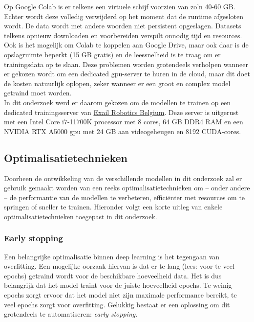 Op Google Colab is er telkens een virtuele schijf voorzien van zo'n 40-60 GB. Echter wordt deze volledig verwijderd op het moment dat de runtime afgesloten wordt. De data wordt met andere woorden niet persistent opgeslagen. Datasets telkens opnieuw downloaden en voorbereiden verspilt onnodig tijd en resources. Ook is het mogelijk om Colab te koppelen aan Google Drive, maar ook daar is de opslagruimte beperkt (15 GB gratis) en de leessnelheid is te traag om er trainingsdata op te slaan. Deze problemen worden grotendeels verholpen wanneer er gekozen wordt om een dedicated \gls{gpu}-server te huren in de cloud, maar dit doet de kosten natuurlijk oplopen, zeker wanneer er een groot en complex model getraind moet worden. \\

In dit onderzoek werd er daarom gekozen om de modellen te trainen op een dedicated trainingsserver van \href{https://www.exail.com/}{Exail Robotics Belgium}. Deze server is uitgerust met een Intel Core i7-11700K processor met 8 cores, 64 GB DDR4 RAM en een NVIDIA RTX A5000 \gls{gpu} met 24 GB aan videogeheugen en 8192 CUDA-cores. \autocite{TechPowerUp_RTX-A5000}

\subsection{Optimalisatietechnieken}

Doorheen de ontwikkeling van de verschillende modellen in dit onderzoek zal er gebruik gemaakt worden van een reeks optimalisatietechnieken om -- onder andere -- de performantie van de modellen te verbeteren, efficiënter met resources om te springen of sneller te trainen. Hieronder volgt een korte uitleg van enkele optimalisatietechnieken toegepast in dit onderzoek.

\subsubsection{Early stopping}

Een belangrijke optimalisatie binnen deep learning is het tegengaan van \gls{overfitting}. Een mogelijke oorzaak hiervan is dat er te lang (lees: voor te veel epochs) getraind wordt voor de beschikbare hoeveelheid data. Het is dus belangrijk dat het model traint voor de juiste hoeveelheid epochs. Te weinig epochs zorgt ervoor dat het model niet zijn maximale performance bereikt, te veel epochs zorgt voor \gls{overfitting}. Gelukkig bestaat er een oplossing om dit grotendeels te automatiseren: \emph{early stopping}. \autocite{Ying_2019} \\

